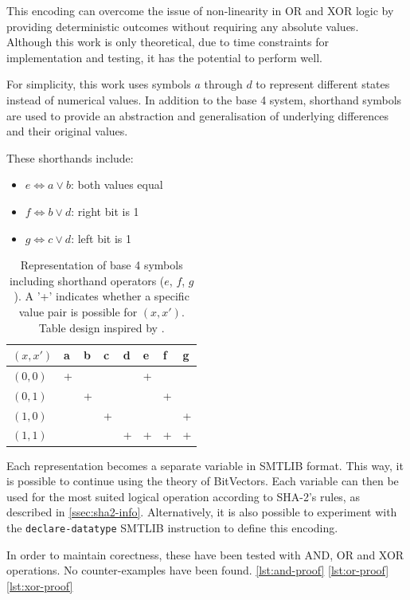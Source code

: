 \documentclass[a4paper]{report}
\begin{document}
This encoding can overcome the issue of non-linearity in OR and XOR logic by providing deterministic outcomes without requiring any absolute values.
Although this work is only theoretical, due to time constraints for implementation and testing, it has the potential to perform well.

For simplicity, this work uses symbols $a$ through $d$ to represent different states instead of numerical values.
In addition to the base 4 system, shorthand symbols are used to provide an abstraction and generalisation of underlying differences and their original values.

These shorthands include:
\begin{itemize}
    \item $e \Leftrightarrow a \vee b$: both values equal
    \item $f \Leftrightarrow b \vee d$: right bit is 1
    \item $g \Leftrightarrow c \vee d$: left bit is 1
\end{itemize}

\begin{table}[H]
\centering
\begin{tabular}{llllllll}
\hline
$(x, x')$ & a & b & c & d & e & f & g \\ \hline
$(0, 0)$  & + &   &   &   & + &   &   \\
$(0, 1)$  &   & + &   &   &   & + &   \\
$(1, 0)$  &   &   & + &   &   &   & + \\
$(1, 1)$  &   &   &   & + & + & + & + \\ \hline
\end{tabular}
\caption{Representation of base 4 symbols including shorthand operators ($e$, $f$, $g$). A '+' indicates whether a specific value pair is possible
for $(x, x')$. Table design inspired by \cite{alamgir_2024}.}
\label{tab:base4-representation}
\end{table}

Each representation becomes a separate variable in SMTLIB format.
This way, it is possible to continue using the theory of BitVectors.
Each variable can then be used for the most suited logical operation according to SHA-2's rules, as described in \ref{ssec:sha2-info}.
Alternatively, it is also possible to experiment with the \texttt{declare-datatype} SMTLIB instruction to define this encoding.

In order to maintain corectness, these have been tested with AND, OR and XOR operations.
No counter-examples have been found. \ref{lst:and-proof} \ref{lst:or-proof} \ref{lst:xor-proof}
\end{document}
